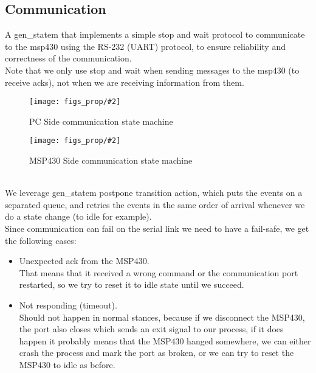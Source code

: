 \documentclass{article}
\newcommand{\myfig}[4]{
\begin{figure}[h]
    \centering
    \captionsetup{justification=centering}
    \texttt{[image: figs\_prop/\#2]}
    \caption{#3}
    \label{fig:#4}
\end{figure}
}
\begin{document}
\subsection{Communication}
A gen\_statem that implements a simple stop and wait protocol to communicate to the msp430 using the RS-232 (UART) protocol, to ensure reliability and correctness of the communication.\\
Note that we only use stop and wait when sending messages to the msp430 (to receive acks), not when we are receiving information from them.\\
\myfig{0.6}{Communication.drawio.png}{PC Side communication state machine}{}
\myfig{0.5}{Communication-msp430.drawio.png}{MSP430 Side communication state machine}{}
\\
We leverage gen\_statem postpone transition action, which puts the events on a separated queue, and retries the events in the same order of arrival whenever we do a state change (to idle for example).\\
Since communication can fail on the serial link we need to have a fail-safe, we get the following cases:
\begin{itemize}
    \item Unexpected ack from the MSP430.\\
    That means that it received a wrong command or the communication port restarted, so we try to reset it to idle state until we succeed.
    \item Not responding (timeout).\\
    Should not happen in normal stances, because if we disconnect the MSP430, the port also closes which sends an exit signal to our process, if it does happen it probably means that the MSP430 hanged somewhere, we can either crash the process and mark the port as broken, or we can try to reset the MSP430 to idle as before.
\end{itemize}
\end{document}
